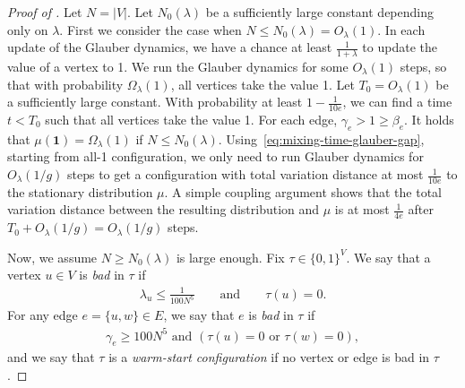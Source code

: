 \documentclass[10pt,a4paper]{amsart}
\begin{document}
\begin{proof}[Proof of ]
Let $N = |V|$. 
Let $N_0(\lambda)$ be a sufficiently large constant depending only on $\lambda$. First we consider the case when $N \leq N_0(\lambda) =  O_\lambda(1)$.
In each update of the Glauber dynamics, we have a chance at least $\frac{1}{1+\lambda}$ to update the value of a vertex to 1. 
We run the Glauber dynamics for some $O_\lambda(1)$ steps, so that with probability $\Omega_\lambda(1)$, all vertices take the value 1. 
Let $T_0 = O_\lambda(1)$ be a sufficiently large constant. With probability at least $1 - \frac{1}{10e}$, we can find a time $t < T_0$ such that all vertices take the value 1.
For each edge, $\gamma_e > 1 \geq \beta_e$. It holds that $\mu(\boldsymbol{1}) = \Omega_\lambda(1)$ if $N \leq N_0(\lambda)$. Using~\eqref{eq:mixing-time-glauber-gap}, starting from all-1 configuration, we only need to run Glauber dynamics for $O_\lambda(1/g)$ steps to get a configuration with total variation distance at most $\frac{1}{10e}$ to the stationary distribution $\mu$. 
A simple coupling argument shows that the total variation distance between the resulting distribution and $\mu$ is at most $\frac{1}{4e}$ after $T_0 + O_\lambda(1/g) = O_\lambda(1/g)$ steps.

Now, we assume $N \geq N_0(\lambda)$ is large enough.
Fix $\tau \in \{0,1\}^V$.
We say that a vertex $u \in V$ is \emph{bad} in $\tau$ if
\begin{align*}
    \lambda_u \leq \frac{1}{100 N^5}
    \qquad\text{and}\qquad
    \tau(u) = 0.
\end{align*}
For any edge $e = \{u,w\} \in E$, we say that $e$ is \emph{bad} in $\tau$ if
\begin{align*}
\gamma_e \geq 100N^5 \text{ and } (\tau(u) = 0 \text{ or } \tau(w) = 0),
\end{align*}
and we say that $\tau$ is a \emph{warm-start configuration} if no vertex or edge is bad in $\tau$.


\end{proof}
\end{document}
